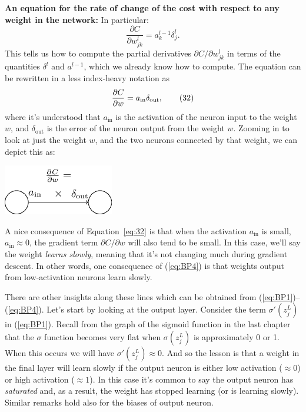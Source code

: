 \documentclass[a4paper,twoside,10pt]{book}
\begin{document}
\textbf{An equation for the rate of change of the cost with respect to any weight in the network:} In particular:
\begin{equation}
\frac{\partial C}{\partial w^l_{jk}} = a^{l-1}_k \delta^l_j.
\tag{BP4}\label{eq:BP4}
\end{equation}
This tells us how to compute the partial derivatives $\partial{}C/\partial{}w^l_{jk}$ in terms of the quantities $\delta^l$ and $a^{l-1}$, which we already know how to compute. The equation can be rewritten in a less index-heavy notation as
\begin{equation}
\frac{\partial C}{\partial w} = a_{\rm in} \delta_{\rm out},
\tag{32}\label{eq:32}
\end{equation}
where it's understood that $a_\mathrm{in}$ is the activation of the neuron input to the weight $w$, and $\delta_\mathrm{out}$ is the error of the neuron output from the weight $w$. Zooming in to look at just the weight $w$, and the two neurons connected by that weight, we can depict this as:

\begin{center}
	\includegraphics[width=0.35\linewidth]{./figures/ch2/tikz20}
\end{center}
A nice consequence of Equation~\ref{eq:32} is that when the activation $a_\mathrm{in}$ is small, $a_\mathrm{in}\approx0$, the gradient term $\partial{}C/\partial{}w$ will also tend to be small. In this case, we'll say the weight \textit{learns slowly}, meaning that it's not changing much during gradient descent. In other words, one consequence of (\ref{eq:BP4}) is that weights output from low-activation neurons learn slowly.

There are other insights along these lines which can be obtained from (\ref{eq:BP1})--(\ref{eq:BP4}). Let's start by looking at the output layer. Consider the term $\sigma'(z^L_j)$ in (\ref{eq:BP1}). Recall from the graph of the sigmoid function in the last chapter that the $\sigma$ function becomes very flat when $\sigma(z^L_j)$ is approximately 0 or 1. When this occurs we will have $\sigma'(z^L_j)\approx0$. And so the lesson is that a weight in the final layer will learn slowly if the output neuron is either low activation ($\approx0$) or high activation ($\approx1$). In this case it's common to say the output neuron has \textit{saturated} and, as a result, the weight has stopped learning (or is learning slowly). Similar remarks hold also for the biases of output neuron.
\end{document}
